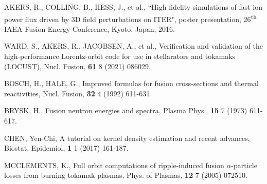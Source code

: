 \documentclass[10pt, a4paper, twoside]{article}
\begin{document}
\begin{thebibliography}{9}
    AKERS, R., COLLING, B., HESS, J., et al.,
    ``High fidelity simulations of fast ion power flux driven by 3D field perturbations on ITER",
    poster presentation, 
    26\textsuperscript{th} IAEA Fusion Energy Conference,
    Kyoto, Japan, 
    2016.

    WARD, S., AKERS, R., JACOBSEN, A., et al.,
    Verification and validation of the high-performance Lorentz-orbit code for use in stellarators and tokamaks (LOCUST),
    Nucl. Fusion,
    \textbf{61} 8
    (2021)
    086029.

    BOSCH, H., HALE, G.,
    Improved formulas for fusion cross-sections and thermal reactivities,
    Nucl. Fusion,
    \textbf{32} 4
    (1992)
    611-631.

    BRYSK, H.,
    Fusion neutron energies and spectra,
    Plasma Phys.,
    \textbf{15} 7
    (1973)
    611-617.

    CHEN, Yen-Chi,
    A tutorial on kernel density estimation and recent advances,
    Biostat. Epidemiol,
    \textbf{1} 1
    (2017)
    161-187.

    MCCLEMENTS, K.,
    Full orbit computations of ripple-induced fusion $\alpha$-particle losses from burning tokamak plasmas,
    Phys. of Plasmas,
    \textbf{12} 7
    (2005)
    072510.



\end{thebibliography}
\end{document}
